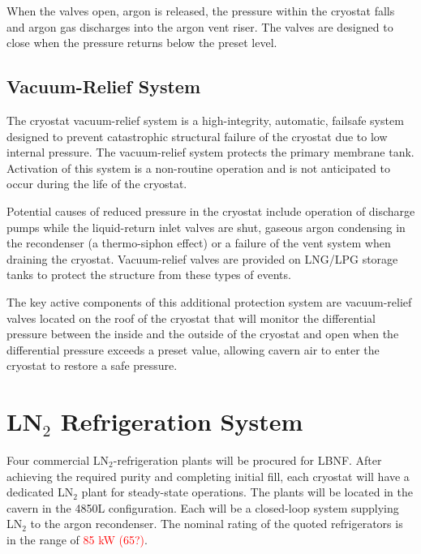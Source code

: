 When the valves open, argon is released, the pressure within the cryostat falls and argon gas discharges into the argon vent riser.  The valves are designed to close when the pressure returns below the preset level.

\subsection{Vacuum-Relief System}

The cryostat vacuum-relief system is a high-integrity, automatic, failsafe system designed to prevent catastrophic structural failure of the cryostat due to low internal pressure.  The vacuum-relief system protects the primary membrane tank. Activation of this system is a non-routine operation and is not anticipated to occur during the life of the cryostat. 

Potential causes of reduced pressure in the cryostat include operation of discharge pumps while the liquid-return inlet valves are shut, gaseous argon condensing in the recondenser (a thermo-siphon effect) or a failure of the vent system when draining the cryostat.  Vacuum-relief valves are provided on LNG/LPG storage tanks to protect the structure from these types of events.  


The key active components of this additional protection system are vacuum-relief valves located on the roof of the cryostat that will monitor the differential pressure between the inside and the outside of the cryostat and open when the differential pressure exceeds a preset value, allowing cavern air to enter the cryostat to restore a safe pressure. 

\section{LN$_2$ Refrigeration System}
\label{sec:ln-refrig-sys}
Four commercial LN$_2$-refrigeration plants will be procured for LBNF.  
After achieving the required purity and completing initial fill, each 
cryostat will have a dedicated LN$_2$ plant for steady-state operations.
The plants will be located in the cavern in the 
4850L configuration. Each will be a closed-loop system supplying LN$_2$
to the argon recondenser. The nominal rating of the quoted
refrigerators is in the range of \textcolor{red}{85 kW (65?)}.

